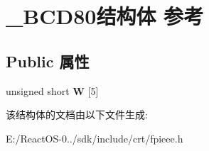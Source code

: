 \hypertarget{struct___b_c_d80}{}\section{\+\_\+\+B\+C\+D80结构体 参考}
\label{struct___b_c_d80}
\subsection*{Public 属性}
\begin{DoxyCompactItemize}
\item 
\mbox{\label{struct___b_c_d80_abd82fbeebbf67503fbc98cc26c2a3085}} 
unsigned short {\bfseries W} \mbox{[}5\mbox{]}
\end{DoxyCompactItemize}


该结构体的文档由以下文件生成\+:\begin{DoxyCompactItemize}
\item 
E\+:/\+React\+O\+S-\/0../sdk/include/crt/fpieee.\+h\end{DoxyCompactItemize}
